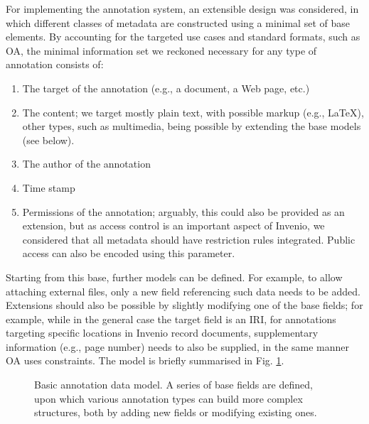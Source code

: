 
For implementing the annotation system, an extensible design was considered, in
which different classes of metadata are constructed using a minimal set of base
elements.  By accounting for the targeted use cases and standard formats, such
as OA, the minimal information set we reckoned necessary for any type of
annotation consists of:
\begin{enumerate}
  \item The target of the annotation (e.g., a document, a Web page, etc.)
  \item The content; we target mostly plain text, with possible markup
        (e.g., LaTeX), other types, such as multimedia, being possible by
        extending the base models (see below).
  \item The author of the annotation
  \item Time stamp
  \item Permissions of the annotation; arguably, this could also be provided as
        an extension, but as access control is an important aspect of Invenio,
        we considered that all metadata should have restriction rules
        integrated. Public access can also be encoded using this parameter.
\end{enumerate}

Starting from this base, further models can be defined. For example, to allow
attaching external files, only a new field referencing such data needs to be
added. Extensions should also be possible by slightly modifying one of the base
fields; for example, while in the general case the target field is an IRI, for
annotations targeting specific locations in Invenio record documents,
supplementary information (e.g., page number) needs to also be supplied, in the
same manner OA uses constraints. The model is briefly summarised in Fig.
\ref{fig:datamodel}.

\begin{figure}[!ht]
  \centering
  \caption[Basic annotation data model]
          {Basic annotation data model. A series of base fields are defined,
           upon which various annotation types can build more complex
           structures, both by adding new fields or modifying existing ones.}
  \label{fig:datamodel}
\end{figure}

